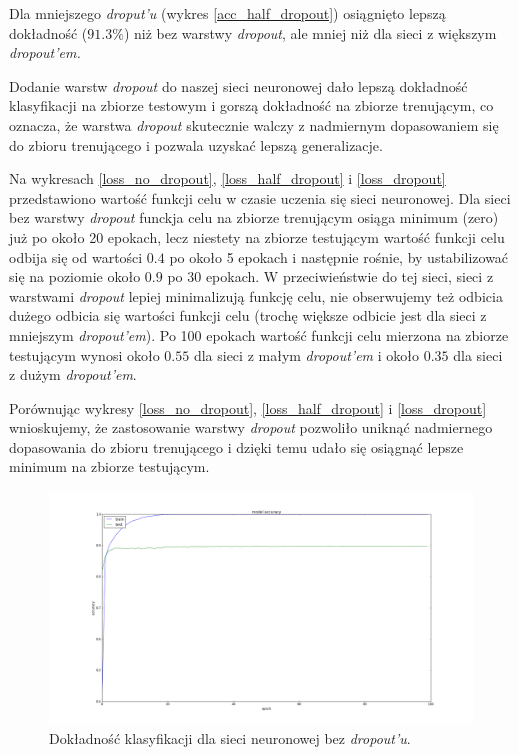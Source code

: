 \documentclass[12pt]{article}
\begin{document}
Dla mniejszego \textit{droput'u} (wykres \ref{acc_half_dropout}) osiągnięto lepszą dokładność ($91.3\%$) niż bez warstwy \textit{dropout}, ale mniej niż dla sieci z większym \textit{dropout'em.} 

Dodanie warstw \textit{dropout} do naszej sieci neuronowej dało lepszą dokładność klasyfikacji na zbiorze testowym i gorszą dokładność na zbiorze trenującym, co oznacza, że warstwa \textit{dropout} skutecznie walczy z nadmiernym dopasowaniem się do zbioru trenującego i pozwala uzyskać lepszą generalizacje.

Na wykresach \ref{loss_no_dropout}, \ref{loss_half_dropout} i \ref{loss_dropout} przedstawiono wartość funkcji celu w czasie uczenia się sieci neuronowej. Dla sieci bez warstwy \textit{dropout} funckja celu na zbiorze trenującym osiąga minimum (zero) już po około 20 epokach, lecz niestety na zbiorze testującym wartość funkcji celu odbija się od wartości $0.4$ po około 5 epokach i następnie rośnie, by ustabilizować się na poziomie około $0.9$ po 30 epokach. W przeciwieństwie do tej sieci, sieci z warstwami \textit{dropout} lepiej minimalizują funkcję celu, nie obserwujemy też odbicia dużego odbicia się wartości funkcji celu (trochę większe odbicie jest dla sieci z mniejszym \textit{dropout'em}). Po 100 epokach wartość funkcji celu mierzona na zbiorze testującym wynosi około $0.55$ dla sieci z małym \textit{dropout'em} i około $0.35$ dla sieci z dużym \textit{dropout'em}.

Porównując wykresy \ref{loss_no_dropout}, \ref{loss_half_dropout} i \ref{loss_dropout} wnioskujemy, że zastosowanie warstwy \textit{dropout} pozwoliło uniknąć nadmiernego dopasowania do zbioru trenującego i dzięki temu udało się osiągnąć lepsze minimum na zbiorze testującym.


\begin{figure}[!ht]
\centering
\includegraphics[scale=0.25]{acc_no_dropout}
\caption{Dokładność klasyfikacji dla sieci neuronowej bez \textit{dropout'u}.}
\label{acc_no_dropout}
\end{figure}
\end{document}
